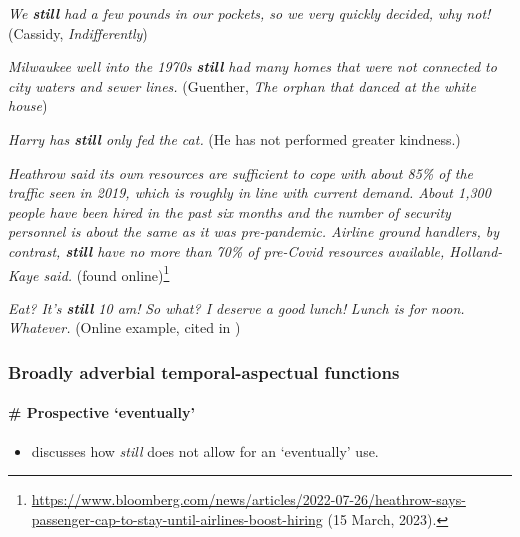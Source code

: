 \begin{exe}

	\ex\label{exAppendixEnglishScalar1}
	\textit{We \textbf{still} had a few pounds in our pockets, so we very quickly decided, why not!} (Cassidy, \textit{Indifferently})
	
	\ex\label{exAppendixEnglishScalar2}
	\textit{Milwaukee well into the 1970s \textbf{still} had many homes that were not connected to city waters and sewer lines.} (Guenther, \textit{The orphan that danced at the white house})
	
	\ex\label{exAppendixEnglishScalar3}
	\textit{Harry has \textbf{still} only fed the cat.} (He has not performed greater kindness.) \parencite[203]{Michaelis1993}
		
	\ex\label{exAppendixEnglishScalar4}
\textit{Heathrow said its own resources are sufficient to cope with about 85\% of the traffic seen in 2019, which is roughly in line with current demand. About 1,300 people have been hired in the past six months and the number of security personnel is about the same as it was pre-pandemic. Airline ground handlers, by contrast, \textbf{still} have no more than 70\% of pre-Covid resources available, Holland-Kaye said.} (found online)\footnote{\url{https://www.bloomberg.com/news/articles/2022-07-26/heathrow-says-passenger-cap-to-stay-until-airlines-boost-hiring} (15 March, 2023).}
	
	\ex\label{exAppendixEnglishScalar5}
	\begin{xlist}
		\textit{ Eat? It's \textbf{still} 10 am!}
		 \textit{So what? I deserve a good lunch!}
		 \textit{Lunch is for noon.}
		 \textit{Whatever. }(Online example, cited in \cite[2 fn2]{Ippolito2007})
	\end{xlist}

\end{exe}

\subsubsection{Broadly adverbial temporal-aspectual functions}
\paragraph{\# Prospective \lq eventually'}
\begin{itemize}
	\item \textcite[ch. 7]{Koenig1991} discusses how \textit{still} does not allow for an \lq eventually' use.
\end{itemize}

